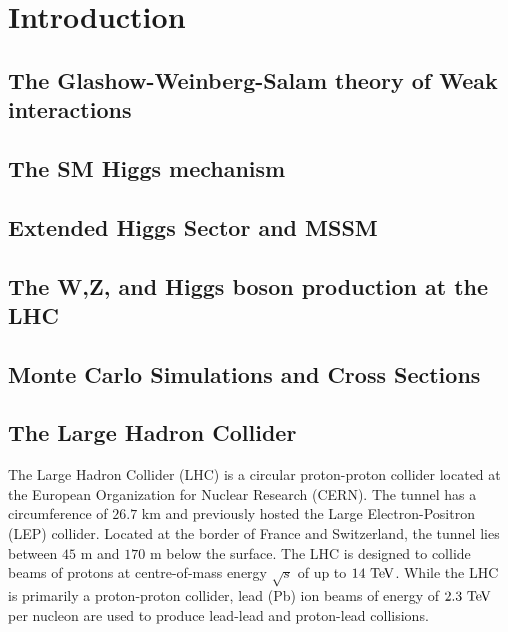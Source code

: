 \chapter{Introduction}

\section{The Glashow-Weinberg-Salam theory of Weak interactions}

\section{The SM Higgs mechanism}

\section{Extended Higgs Sector and MSSM}

\section{The W,Z, and Higgs boson production at the LHC}

\section{Monte Carlo Simulations and Cross Sections}
    
\section{The Large Hadron Collider}
The Large Hadron Collider (LHC)\cite{1748-0221-3-08-S08001} is a circular proton-proton collider located at the European Organization for Nuclear Research (CERN). The tunnel has a circumference of $26.7$ km and previously hosted the Large Electron-Positron (LEP)\cite{lep1,lep2} collider. Located at the border of France and Switzerland, the tunnel lies between $45$ m and $170$ m below the surface. The LHC is designed to collide beams of protons at centre-of-mass energy $\sqrt{s}$ of up to $14~\mathrm{Te\kern -0.1em V}$. While the LHC is primarily a proton-proton collider, lead (Pb) ion beams of energy of $2.3~\mathrm{Te\kern -0.1em V}$ per nucleon are used to produce lead-lead  and proton-lead collisions.  
 
